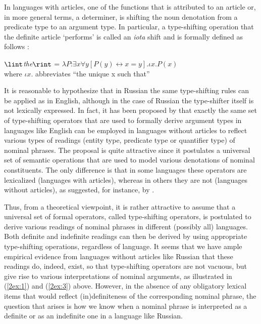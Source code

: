 \documentclass[output=paper]{langsci/langscibook}
\begin{document}
In languages with articles, one of the functions that is attributed to an article or, in more general terms, a determiner, is shifting the noun denotation from a predicate type to an argument type. In particular, a type-shifting operation that the definite article `performs' is called an {\emph{iota}} shift and is formally defined as follows \citep[see][998]{heim:11}:

\begin{exe}
\ex\label{2ex:4}
$\lint${\emph{the}}$\rint$ = $\lambda P$:$\exists x\forall y[P(y) \leftrightarrow x=y].\iota x.P(x)$\\
where $\iota x.$ abbreviates ``the unique x such that''
\end{exe}

\largerpage
{
It is reasonable to hypothesize that in Russian the same type-shifting rules can be applied as in English, although in the case of Russian the type-shifter itself is not lexically expressed. In fact, it has been proposed by \cite{chierchia:98} that exactly the same set of type-shifting operators that are used to formally derive argument types in languages like English can be employed in languages without articles to reflect various types of readings (entity type, predicate type or quantifier type) of nominal phrases. The proposal is quite attractive since it postulates a universal set of semantic operations that are used to model various denotations of nominal constituents. The only difference is that in some languages these operators are lexicalized (languages with articles), whereas in others they are not (languages without articles), as suggested, for instance, by \cite{dayal:04}.
}

Thus, from a theoretical viewpoint, it is rather attractive to assume that a universal set of formal operators, called type-shifting operators, is postulated to derive various readings of nominal phrases in different (possibly all) languages. Both definite and indefinite readings can then be derived by using appropriate type-shifting operations, regardless of language. It seems that we have ample empirical evidence from languages without articles like Russian that these readings do, indeed, exist, so that type-shifting operators are not vacuous, but give rise to various interpretations of nominal arguments, as illustrated in (\ref{2ex:1}) and (\ref{2ex:3}) above. However, in the absence of any obligatory lexical items that would reflect (in)definiteness of the corresponding nominal phrase, the question that arises is how we know when a nominal phrase is interpreted as a definite or as an indefinite one in a language like Russian.
\end{document}
